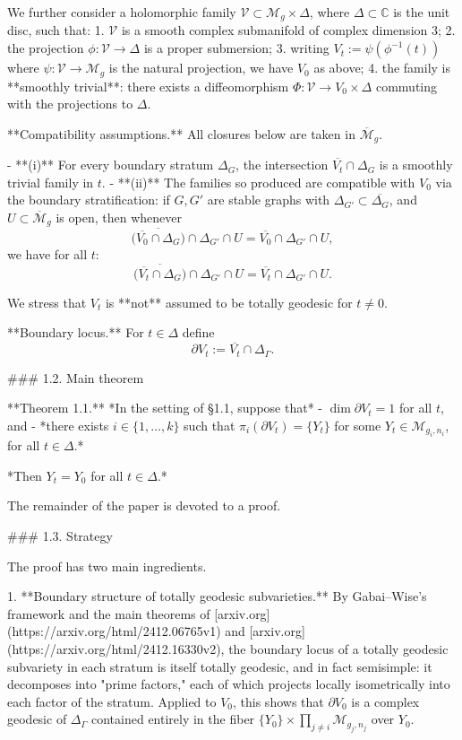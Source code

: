 We further consider a holomorphic family $\mathcal{V} \subset \mathcal{M}_g \times \Delta$, where $\Delta \subset \mathbb{C}$ is the unit disc, such that:
1. $\mathcal{V}$ is a smooth complex submanifold of complex dimension $3$;
2. the projection $\phi : \mathcal{V} \to \Delta$ is a proper submersion;
3. writing $V_t := \psi(\phi^{-1}(t))$ where $\psi : \mathcal{V} \to \mathcal{M}_g$ is the natural projection, we have $V_0$ as above;
4. the family is **smoothly trivial**: there exists a diffeomorphism $\Phi : \mathcal{V} \to V_0 \times \Delta$ commuting with the projections to $\Delta$.

**Compatibility assumptions.** All closures below are taken in $\overline{\mathcal{M}}_g$.

- **(i)** For every boundary stratum $\Delta_G$, the intersection $\overline{V_t} \cap \Delta_G$ is a smoothly trivial family in $t$.
- **(ii)** The families so produced are compatible with $V_0$ via the boundary stratification: if $G, G'$ are stable graphs with $\Delta_{G'} \subset \overline{\Delta_G}$, and $U \subset \overline{\mathcal{M}}_g$ is open, then whenever
$$\overline{\bigl(\overline{V_0} \cap \Delta_G\bigr)} \cap \Delta_{G'} \cap U = \overline{V_0} \cap \Delta_{G'} \cap U,$$
we have for all $t$:
$$\overline{\bigl(\overline{V_t} \cap \Delta_G\bigr)} \cap \Delta_{G'} \cap U = \overline{V_t} \cap \Delta_{G'} \cap U.$$

We stress that $V_t$ is **not** assumed to be totally geodesic for $t \neq 0$.

**Boundary locus.** For $t \in \Delta$ define
$$\partial V_t := \overline{V_t} \cap \Delta_\Gamma.$$

### 1.2. Main theorem

**Theorem 1.1.** *In the setting of §1.1, suppose that*
- $\dim \partial V_t = 1$ for all $t$, and
- *there exists $i \in \{1, \ldots, k\}$ such that $\pi_i(\partial V_t) = \{Y_t\}$ for some $Y_t \in \mathcal{M}_{g_i, n_i}$, for all $t \in \Delta$.*

*Then $Y_t = Y_0$ for all $t \in \Delta$.*

The remainder of the paper is devoted to a proof.

### 1.3. Strategy

The proof has two main ingredients.

1. **Boundary structure of totally geodesic subvarieties.** By Gabai–Wise's framework and the main theorems of [arxiv.org](https://arxiv.org/html/2412.06765v1) and [arxiv.org](https://arxiv.org/html/2412.16330v2), the boundary locus of a totally geodesic subvariety in each stratum is itself totally geodesic, and in fact semisimple: it decomposes into "prime factors," each of which projects locally isometrically into each factor of the stratum. Applied to $V_0$, this shows that $\partial V_0$ is a complex geodesic of $\Delta_\Gamma$ contained entirely in the fiber $\{Y_0\} \times \prod_{j \neq i} \mathcal{M}_{g_j, n_j}$ over $Y_0$.

